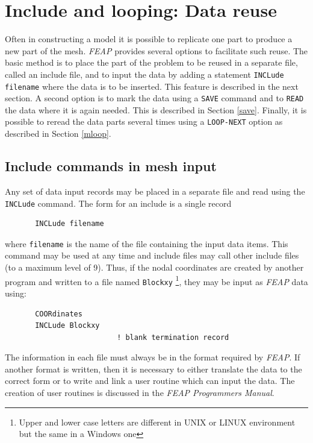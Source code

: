 \chapter[Include and looping: Data reuse]{Include and looping: Data reuse}
\label{subst}

Often in constructing a model it is possible to replicate one part to produce
a new part of the mesh.  \textsl{FEAP} provides several options to facilitate
such reuse.  The basic method is to place the part of the problem to be
reused in a separate file, called an include file, and to input the data by
adding a statement \texttt{INCLude filename} where the data is to be 
inserted.  This feature is described in the next section.  A second option
is to mark the data using a \texttt{SAVE} command and to \texttt{READ} the
data where it is again needed.  This is described in Section \ref{save}.
Finally, it is possible to reread the data parts several times using a
\texttt{LOOP-NEXT} option as described in Section \ref{mloop}.

\section{Include commands in mesh input}
\label{include}

Any set of data input records may be placed in a separate file and read using
the \texttt{INCLude} command.  The form for an include is a single record
\begin{verbatim}
       INCLude filename
\end{verbatim}
where \texttt{filename} is the name of the file containing the input data items.
This command may be used at any time and include files may call other
include files (to a maximum level of 9).  Thus, if the nodal coordinates
are created by another program and written to a file named \texttt{Blockxy}
{\footnote{Upper and lower case letters are different in UNIX or LINUX 
environment but the same in a Windows one}},
they may be input as \textsl{FEAP} data using:
\begin{verbatim}
       COORdinates
       INCLude Blockxy
                          ! blank termination record
\end{verbatim}
The information in each file must always be in the format required by
\textsl{FEAP}.
If another format is written, then it is necessary to either translate the
data to the correct form or to write and link a user routine which can
input the data.
The creation of user routines is discussed in the \textsl{FEAP Programmers
Manual}.

